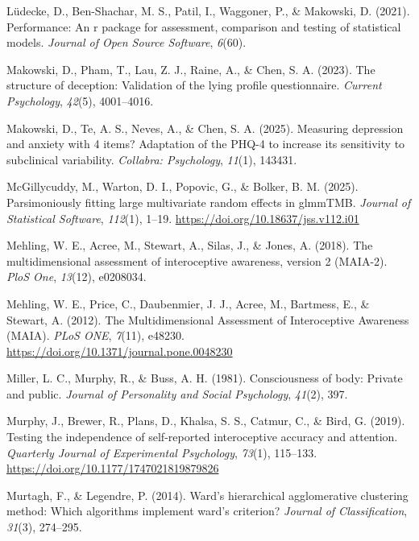 \documentclass[
  jou,
  floatsintext,
  longtable,
  nolmodern,
  notxfonts,
  notimes,
  colorlinks=true,linkcolor=blue,citecolor=blue,urlcolor=blue]{apa7}
\newlength{\cslhangindent}
\newenvironment{CSLReferences}[2] %
 {\begin{list}{}{%
  \setlength{\itemindent}{0pt}
  \setlength{\leftmargin}{0pt}
  \setlength{\parsep}{0pt}
  \ifodd #1
   \setlength{\leftmargin}{\cslhangindent}
   \setlength{\itemindent}{-1\cslhangindent}
  \fi
  \setlength{\itemsep}{#2\baselineskip}}}
 {\end{list}}
\begin{document}
\begin{CSLReferences}{1}{0}
Lüdecke, D., Ben-Shachar, M. S., Patil, I., Waggoner, P., \& Makowski,
D. (2021). Performance: An r package for assessment, comparison and
testing of statistical models. \emph{Journal of Open Source Software},
\emph{6}(60).

Makowski, D., Pham, T., Lau, Z. J., Raine, A., \& Chen, S. A. (2023).
The structure of deception: Validation of the lying profile
questionnaire. \emph{Current Psychology}, \emph{42}(5), 4001--4016.

Makowski, D., Te, A. S., Neves, A., \& Chen, S. A. (2025). Measuring
depression and anxiety with 4 items? Adaptation of the PHQ-4 to increase
its sensitivity to subclinical variability. \emph{Collabra: Psychology},
\emph{11}(1), 143431.

McGillycuddy, M., Warton, D. I., Popovic, G., \& Bolker, B. M. (2025).
Parsimoniously fitting large multivariate random effects in {glmmTMB}.
\emph{Journal of Statistical Software}, \emph{112}(1), 1--19.
\url{https://doi.org/10.18637/jss.v112.i01}

Mehling, W. E., Acree, M., Stewart, A., Silas, J., \& Jones, A. (2018).
The multidimensional assessment of interoceptive awareness, version 2
(MAIA-2). \emph{PloS One}, \emph{13}(12), e0208034.

Mehling, W. E., Price, C., Daubenmier, J. J., Acree, M., Bartmess, E.,
\& Stewart, A. (2012). The Multidimensional Assessment of Interoceptive
Awareness (MAIA). \emph{PLoS ONE}, \emph{7}(11), e48230.
\url{https://doi.org/10.1371/journal.pone.0048230}

Miller, L. C., Murphy, R., \& Buss, A. H. (1981). Consciousness of body:
Private and public. \emph{Journal of Personality and Social Psychology},
\emph{41}(2), 397.

Murphy, J., Brewer, R., Plans, D., Khalsa, S. S., Catmur, C., \& Bird,
G. (2019). Testing the independence of self-reported interoceptive
accuracy and attention. \emph{Quarterly Journal of Experimental
Psychology}, \emph{73}(1), 115--133.
\url{https://doi.org/10.1177/1747021819879826}

Murtagh, F., \& Legendre, P. (2014). Ward's hierarchical agglomerative
clustering method: Which algorithms implement ward's criterion?
\emph{Journal of Classification}, \emph{31}(3), 274--295.


\end{CSLReferences}
\end{document}

